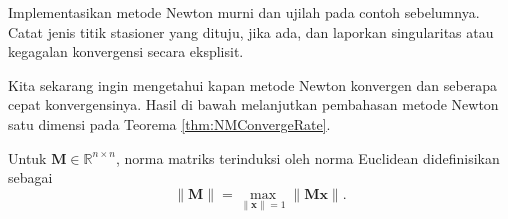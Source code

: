 \begin{exercise} Implementasikan metode Newton murni dan ujilah pada contoh sebelumnya. Catat jenis titik stasioner yang dituju, jika ada, dan laporkan singularitas atau kegagalan konvergensi secara eksplisit.
\end{exercise}

\begin{remark} Kita sekarang ingin mengetahui kapan metode Newton konvergen dan seberapa cepat konvergensinya. Hasil di bawah melanjutkan pembahasan metode Newton satu dimensi pada Teorema \ref{thm:NMConvergeRate}.
\end{remark}

\begin{definition} Untuk $\mathbf{M}\in\mathbb{R}^{n\times n}$, norma matriks terinduksi oleh norma Euclidean didefinisikan sebagai
\begin{equation}
\lVert\mathbf{M}\rVert=
\max_{\lVert\mathbf{x}\rVert=1}\lVert\mathbf{M}\mathbf{x}\rVert.
\end{equation}
\end{definition}

